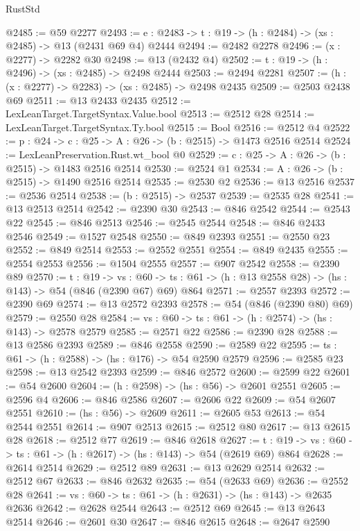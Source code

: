 \begin{lexlean}{RustStd}
\begin{coremodule}
@2485 := @59 @2277
@2493 := {e : @2483} -> {t : @19} -> (h : @2484) -> (xs : @2485) -> @13 (@2431 @69 @4) @2444
@2494 := @2482 @2278
@2496 := (x : @2277) -> @2282 @30
@2498 := @13 (@2432 @4)
@2502 := {t : @19} -> (h : @2496) -> (xs : @2485) -> @2498 @2444
@2503 := @2494 @2281
@2507 := (h : (x : @2277) -> @2283) -> (xs : @2485) -> @2498 @2435
@2509 := @2503 @2438 @69
@2511 := @13 @2433 @2435
@2512 := LexLeanTarget.TargetSyntax.Value.bool
@2513 := @2512 @28
@2514 := LexLeanTarget.TargetSyntax.Ty.bool
@2515 := Bool
@2516 := @2512 @4
@2522 := {p : @24} -> {c : @25} -> {A : @26} -> (b : @2515) -> @1473 @2516 @2514
@2524 := LexLeanPreservation.Rust.wt_bool @0
@2529 := {c : @25} -> {A : @26} -> (b : @2515) -> @1483 @2516 @2514
@2530 := @2524 @1
@2534 := {A : @26} -> (b : @2515) -> @1490 @2516 @2514
@2535 := @2530 @2
@2536 := @13 @2516
@2537 := @2536 @2514
@2538 := (b : @2515) -> @2537
@2539 := @2535 @28
@2541 := @13 @2513 @2514
@2542 := @2390 @30
@2543 := @846 @2542
@2544 := @2543 @22
@2545 := @846 @2513
@2546 := @2545 @2544
@2548 := @846 @2433 @2546
@2549 := @1527 @2548
@2550 := @849 @2393
@2551 := @2550 @23
@2552 := @849 @2514
@2553 := @2552 @2551
@2554 := @849 @2435
@2555 := @2554 @2553
@2556 := @1504 @2555
@2557 := @907 @2542
@2558 := @2390 @89
@2570 := {t : @19} ->
  {vs : @60} -> {ts : @61} -> (h : @13 @2558 @28) -> (hs : @143) -> @54 (@846 (@2390 @67) @69) @864
@2571 := @2557 @2393
@2572 := @2390 @69
@2574 := @13 @2572 @2393
@2578 := @54 (@846 (@2390 @80) @69)
@2579 := @2550 @28
@2584 := {vs : @60} -> {ts : @61} -> (h : @2574) -> (hs : @143) -> @2578 @2579
@2585 := @2571 @22
@2586 := @2390 @28
@2588 := @13 @2586 @2393
@2589 := @846 @2558
@2590 := @2589 @22
@2595 := {ts : @61} -> (h : @2588) -> (hs : @176) -> @54 @2590 @2579
@2596 := @2585 @23
@2598 := @13 @2542 @2393
@2599 := @846 @2572
@2600 := @2599 @22
@2601 := @54 @2600
@2604 := (h : @2598) -> (hs : @56) -> @2601 @2551
@2605 := @2596 @4
@2606 := @846 @2586
@2607 := @2606 @22
@2609 := @54 @2607 @2551
@2610 := (hs : @56) -> @2609
@2611 := @2605 @53
@2613 := @54 @2544 @2551
@2614 := @907 @2513
@2615 := @2512 @80
@2617 := @13 @2615 @28
@2618 := @2512 @77
@2619 := @846 @2618
@2627 := {t : @19} -> {vs : @60} -> {ts : @61} -> (h : @2617) -> (hs : @143) -> @54 (@2619 @69) @864
@2628 := @2614 @2514
@2629 := @2512 @89
@2631 := @13 @2629 @2514
@2632 := @2512 @67
@2633 := @846 @2632
@2635 := @54 (@2633 @69)
@2636 := @2552 @28
@2641 := {vs : @60} -> {ts : @61} -> (h : @2631) -> (hs : @143) -> @2635 @2636
@2642 := @2628 @2544
@2643 := @2512 @69
@2645 := @13 @2643 @2514
@2646 := @2601 @30
@2647 := @846 @2615
@2648 := @2647 @2590

\end{coremodule}
\end{lexlean}
